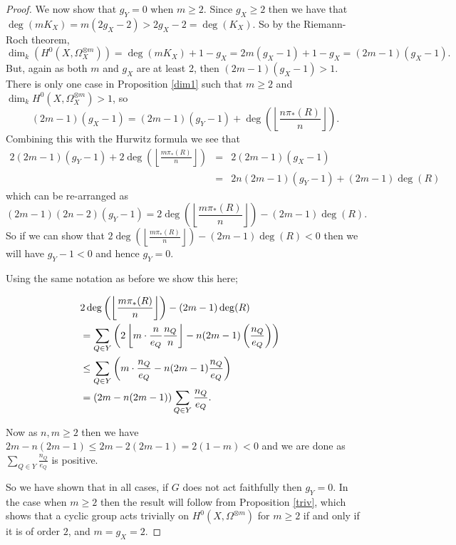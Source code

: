 \documentclass[11pt]{article} %
\begin{document}
\begin{proof}
    We now show that $g_Y=0$ when $m\geq 2$. 
    Since $g_X\geq 2$ then we have that $\deg(mK_X)=m(2g_X-2)>2g_X-2=\deg(K_X)$. 
    So by the Riemann-Roch theorem,
      \begin{equation}\label{eq:riem}
	\dim_k(H^0(X,\Omega_X^{\otimes m}))=\deg(mK_X)+1-g_X=2m(g_X-1)+1-g_X=(2m-1)(g_X-1).
      \end{equation}
    But, again as both $m$ and $g_X$ are at least 2, then $(2m-1)(g_X-1)>1$.
    There is only one case in Proposition \ref{dim1} such that $m\geq 2$ and $\dim_k H^0(X,\Omega_X^{\otimes m})>1$, so 
      \begin{equation*}
	(2m-1)(g_X-1)=(2m-1)(g_Y-1)+\deg\left(\left\lfloor \frac{n\pi_*(R)}{n} \right\rfloor \right).
      \end{equation*}
    Combining this with the Hurwitz formula we see that
      \begin{eqnarray*}
	2(2m-1)(g_Y-1)+2\deg\left(\left\lfloor\frac{m\pi_*(R)}{n}\right\rfloor\right) & = & 2(2m-1)(g_X-1)\\
	& = & 2n(2m-1)(g_Y-1)+(2m-1)\deg(R)
      \end{eqnarray*}
    which can be re-arranged as
      \begin{equation*}
	(2m-1)(2n-2)(g_Y-1)=2\deg\left(\left\lfloor\frac{m\pi_*(R)}{n}\right\rfloor\right)-(2m-1)\deg(R).
      \end{equation*}
    So if we can show that $2\deg\left(\left\lfloor\frac{m\pi_*(R)}{n}\right\rfloor\right)-(2m-1)\deg(R)<0$ then we will have $g_Y-1<0$ and hence $g_Y=0$.

    Using the same notation as before we show this here;
    
      \begin{align*}
	\lefteqn{2\deg\left(\left\lfloor\frac{m\pi_*(R)}{n}\right\rfloor\right)-(2m-1)\deg(R)}\\
	& = \sum_{Q \in Y} \left(2\left\lfloor m\cdot \frac{n}{e_Q}\frac{n_Q}{n}\right\rfloor -n(2m-1)\left(\frac{n_Q}{e_Q}\right)\right) \\
	&\leq   \sum_{Q\in Y}\left( m\cdot\frac{n_Q}{e_Q}-n(2m-1)\frac{n_Q}{e_Q}\right) \\
	& =  (2m-n(2m-1))\sum_{Q\in Y }\frac{n_Q}{e_Q}.
      \end{align*}

    Now as $n,m\geq 2$ then we have $2m-n(2m-1)\leq 2m-2(2m-1)=2(1-m)<0$ and we are done as $\sum_{Q\in Y}\frac{n_Q}{e_Q}$ is positive.

    So we have shown that in all cases, if $G$ does not act faithfully then $g_Y=0$. 
    In the case when $m\geq 2$ then the result will follow from Proposition \ref{triv}, which shows that a cyclic group acts trivially on $H^0(X,\Omega^{\otimes m})$ for $m\geq 2$ if and only if it is of order $2$, and $m=g_X=2$.
    

\end{proof}
\end{document}
